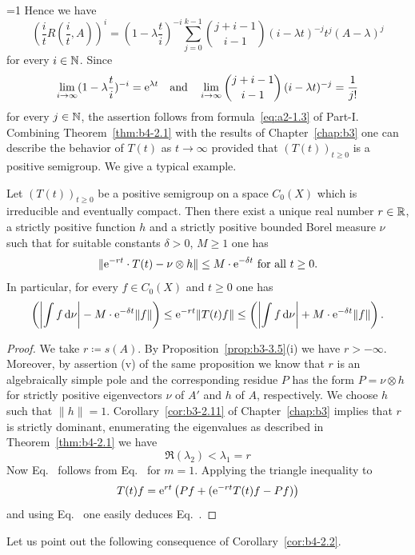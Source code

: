 %
=1 
Hence we have
%
\[
	(\frac{i}{t}R(\frac{i}{t},A))^i = (1-\lambda\frac{t}{i})^{-i}\sum_{j=0}^{k-1}\binom{j+i-1}{i-1}(i-\lambda t)^{-j}t^j(A-\lambda)^j 
\]
%
for every $i \in \mathbb{N}$.
Since 
%
\[
	 \lim_{i\to\infty}(1-\lambda\frac{t}{i})^{-i} = \mathrm{e}^{\lambda t}
	 \quad \text{and} \quad \lim_{i\to\infty}\binom{j+i-1}{i-1}\,(i-\lambda t)^{-j} = \frac{1}{j!}
\]
%
for every $j \in \mathbb{N}$, the assertion follows from 
formula~\eqref{eq:a2-1.3} of Part-I.
\fi
Combining Theorem~\ref{thm:b4-2.1} with the results of Chapter~\ref{chap:b3} one can describe
the behavior of\/ $T(t)$ as $t \to \infty$ provided that $(T(t))_{t \geq 0}$ is a positive semigroup.
We give a typical example.
\begin{corollary}\label{cor:b4-2.2}
	Let $(T(t))_{t \geq 0}$ be a positive semigroup on a space
	$C_{0}(X)$ which is irreducible and eventually compact.
	Then there exist a
	unique real number $r \in \mathbb{R}$, a strictly positive function $h$ and a
	strictly positive bounded Borel measure $\nu$ such that for suitable
	constants $\delta > 0$, $M \geq 1$ one has
	\begin{equation}\label{eq:b4-2.2}
		\|\eu^{-rt}\cdot T(t) - \nu\otimes h\| \leq M\cdot \eu^{-\delta t} \text{ for all } t \geq 0 .
	\end{equation}
	In particular, for every $f \in C_{0}(X)$ and $t \geq 0$ one has
	\begin{equation}\label{eq:b4-2.3} 
		\left(\left|\int f \diff{\nu}\right| - M\cdot \eu^{-\delta t}\|f\|\right) \leq \eu^{-rt}\|T(t)f\| \leq \left(\left|\int f \diff{\nu}\right| + M\cdot \eu^{-\delta t}\|f\|\right).
	\end{equation}
\end{corollary}
\begin{proof}
	We take $r  \coloneq  s(A)$.
	By Proposition~\ref{prop:b3-3.5}(i) we have $r > -\infty$.
	Moreover, by assertion (v) of the same proposition we know that $r$ is
	an algebraically simple pole and the corresponding residue $P$ has the
	form $P = \nu \otimes h$ for strictly positive eigenvectors $\nu$ of\/ $A'$
	and $h$ of\/ $A$, respectively.
    We choose $h$ such that 
	$\|h\| = 1$.
	Corollary~\ref{cor:b3-2.11} of Chapter~\ref{chap:b3} implies that $r$ is strictly
	dominant, \ie enumerating the eigenvalues as described in Theorem~\ref{thm:b4-2.1} we
	have 
\[
	\Re(\lambda_2) < \lambda_1 = r 
\]
Now Eq.~ follows from Eq.~ for $m = 1$.
Applying the triangle inequality to %
\[
	 T(t)f = \mathrm{e}^{rt}\left(Pf + (\mathrm{e}^{-rt}T(t)f-Pf)\right) 
\]
%
and using Eq.~ one easily deduces Eq.~.
\end{proof}
 Let us point out the following consequence of Corollary~\ref{cor:b4-2.2}.

